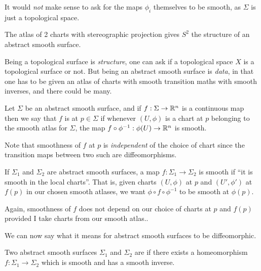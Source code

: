 \documentclass[a4paper]{scrartcl}
\begin{document}
\begin{remark}
    It would \emph{not} make sense to ask for the maps $\phi_i$ themselves to be smooth, as $\Sigma$ is just a topological space.
\end{remark}

\begin{example}
    The atlas of 2 charts with stereographic projection gives $S^2$ the structure of an abstract smooth surface.
\end{example}

\begin{remark}[Philosophical]
    Being a topological surface is \emph{structure}, one can ask if a topological space $X$ is a topological surface or not. But being an abstract smooth surface is \emph{data}, in that one has to be given an atlas of charts with smooth transition maths with smooth inverses, and there could be many.
\end{remark}

\begin{definition}
    Let $\Sigma$ be an abstract smooth surface, and if $f: \Sigma \rightarrow \mathbb{R}^n$ is a continuous map then we say that $f$ is  at $p \in \Sigma$ if whenever $(U, \phi)$ is a chart at $p$ belonging to the smooth atlas for $\Sigma$, the map $f \circ \phi^{-1}: \phi(U) \rightarrow \mathbb{R}^n$ is smooth.
\end{definition}

Note that smoothness of $f$ at $p$ is \emph{independent} of the choice of chart since the transition maps between two such are diffeomorphisms.

\begin{definition}
    If $\Sigma_1$ and $\Sigma_2$ are abstract smooth surfaces, a map $f: \Sigma_1 \rightarrow \Sigma_2$ is smooth if ``it is smooth in the local charts''. That is, given charts $(U, \phi)$ at $p$ and $(U', \phi')$ at $f(p)$ in our chosen smooth atlases, we want $\phi 
    \circ f \circ \phi^{-1}$ to be smooth at $\phi(p)$.
\end{definition}

Again, smoothness of $f$ does not depend on our choice of charts at $p$ and $f(p)$ provided I take charts from our smooth atlas..

We can now say what it means for abstract smooth surfaces to be diffeomorphic.

\begin{definition}[Diffeomorphic]
    Two abstract smooth surfaces $\Sigma_1$ and $\Sigma_2$ are  if there exists a homeomorphism $f: \Sigma_1 \rightarrow \Sigma_2$ which is smooth and has a smooth inverse.
\end{definition}
\end{document}
